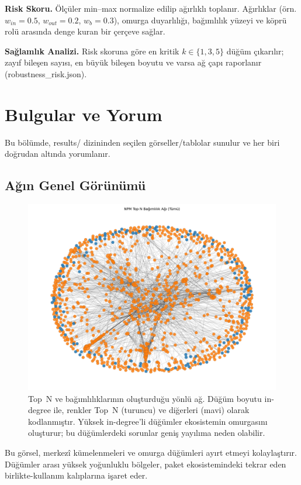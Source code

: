 \documentclass[11pt,a4paper]{article}
\begin{document}
\textbf{Risk Skoru.} Ölçüler min--max normalize edilip ağırlıklı toplanır. Ağırlıklar (örn. $w_{in}=0.5$, $w_{out}=0.2$, $w_b=0.3$), omurga duyarlılığı, bağımlılık yüzeyi ve köprü rolü arasında denge kuran bir çerçeve sağlar.

\textbf{Sağlamlık Analizi.} Risk skoruna göre en kritik $k\in\{1,3,5\}$ düğüm çıkarılır; zayıf bileşen sayısı, en büyük bileşen boyutu ve varsa ağ çapı raporlanır (robustness\_risk.json).

\section{Bulgular ve Yorum}
Bu bölümde, results/ dizininden seçilen görseller/tablolar sunulur ve her biri doğrudan altında yorumlanır.

\subsection{Ağın Genel Görünümü}
\begin{figure}[H]
  \centering
  \includegraphics{network_full_topN.png}
  \caption{Top~N ve bağımlılıklarının oluşturduğu yönlü ağ. Düğüm boyutu in-degree ile, renkler Top~N (turuncu) ve diğerleri (mavi) olarak kodlanmıştır. Yüksek in-degree’li düğümler ekosistemin omurgasını oluşturur; bu düğümlerdeki sorunlar geniş yayılıma neden olabilir.}
\end{figure}

\noindent Bu görsel, merkezî kümelenmeleri ve omurga düğümleri ayırt etmeyi kolaylaştırır. Düğümler arası yüksek yoğunluklu bölgeler, paket ekosistemindeki tekrar eden birlikte-kullanım kalıplarına işaret eder.
\end{document}
